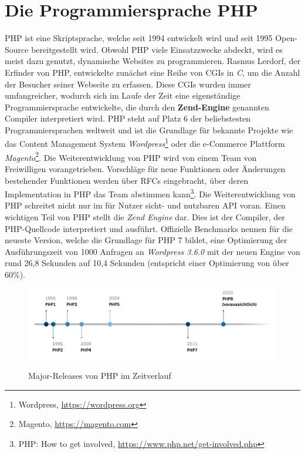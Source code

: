 \section{Die Programmiersprache PHP}\label{zend}
\ac{PHP} ist eine Skriptsprache, welche seit 1994 entwickelt wird und seit 1995 Open-Source bereitgestellt wird.
Obwohl \ac{PHP} viele Einsatzzwecke abdeckt, wird es meist dazu genutzt, dynamische Websites zu programmieren.
Rasmus Lerdorf, der Erfinder von \ac{PHP}, entwickelte zunächst eine Reihe von \acp{CGI} in \textit{C}, um die Anzahl der 
Besucher seiner Webseite zu erfassen. Diese \acp{CGI} wurden immer umfangreicher, wodurch sich im Laufe der Zeit eine 
eigenständige Programmiersprache entwickelte, die durch den \textbf{Zend-Engine} genannten Compiler interpretiert wird.\cite{php_group_php:_nodate-3}
\ac{PHP} steht auf Platz 6 der beliebstesten Programmiersprachen weltweit\cite{carbonnelle_pypl_2019} und ist die Grundlage
für bekannte Projekte wie das Content Management System \textit{Wordpress}\footnote{Wordpress, \url{https://wordpress.org}}
oder die e-Commerce Plattform \textit{Magento}\footnote{Magento, \url{https://magento.com}}. Die Weiterentwicklung 
von \ac{PHP} wird von einem Team von Freiwilligen vorangetrieben. Vorschläge für neue Funktionen oder Änderungen bestehender 
Funktionen werden über \acp{RFC} eingebracht, über deren Implementation in \ac{PHP} das Team abstimmen kann\footnote{PHP: How to get involved, \url{https://www.php.net/get-involved.php}}. 
Die Weiterentwicklung von \acs{PHP} schreitet nicht nur im für Nutzer sicht- und nutzbaren \ac{API} voran. Einen wichtigen Teil 
von \acs{PHP} stellt die \textit{Zend Engine} dar. Dies ist der Compiler, der \acs{PHP}-Quellcode interpretiert und ausführt. Offizielle 
Benchmarks nennen für die neueste Version, welche die Grundlage für \acs{PHP} 7 bildet, eine Optimierung der Ausführungszeit von 1000 Anfragen an \textit{Wordpress 3.6.0} mit der neuen Engine von
rund 26,8 Sekunden auf 10,4 Sekunden (entspricht einer Optimierung von über 60\%).\cite{php_group_php:_nodate-6} 

\begin{figure}[bth]
    \myfloatalign
    {\includegraphics[width=1\linewidth]{gfx/timeline}} \quad
    \caption[Major-Releases von PHP im Zeitverlauf]{Major-Releases von \ac{PHP} im Zeitverlauf}\label{fig:timeline}
\end{figure}

